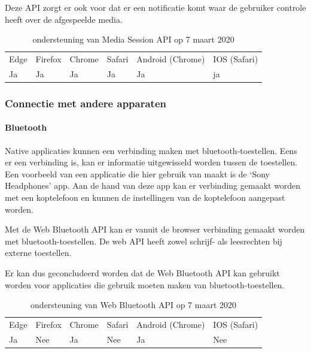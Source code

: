 Deze API zorgt er ook voor dat er een notificatie komt waar de gebruiker controle heeft over de afgespeelde media. 


\begin{table}[H]
	\centering
	\begin{tabular}{llllll}
		Edge & Firefox & Chrome & Safari & Android (Chrome) & IOS (Safari) \\
		Ja   & Ja      & Ja     & Ja     & Ja               & ja          
	\end{tabular}	
	\caption{ondersteuning van Media Session API op 7 maart 2020}
\end{table}



\subsubsection{Connectie met andere apparaten}



\paragraph{Bluetooth }

Native applicaties kunnen een verbinding maken met bluetooth-toestellen. Eens er een verbinding is, kan er informatie uitgewisseld worden tussen de toestellen. Een voorbeeld van een applicatie die hier gebruik van maakt is de ‘Sony Headphones’ app. Aan de hand van deze app kan er verbinding gemaakt worden met een koptelefoon en kunnen de instellingen van de koptelefoon aangepast worden.

Met de Web Bluetooth API \autocite{Grant2020} kan er vanuit de browser verbinding gemaakt worden met bluetooth-toestellen. De web API heeft zowel schrijf- als leesrechten bij externe toestellen. 

Er kan dus geconcludeerd worden dat de Web Bluetooth API kan gebruikt worden voor applicaties die gebruik moeten maken van bluetooth-toestellen.
\autocite{Beaufort2019a}

\begin{table}[H]
	\centering
	\begin{tabular}{llllll}
		Edge & Firefox & Chrome & Safari & Android (Chrome) & IOS (Safari) \\
		Ja   & Nee      & Ja     & Nee     & Ja               & Nee          
	\end{tabular}	
	\caption{ondersteuning van Web Bluetooth API op 7 maart 2020}
\end{table}



